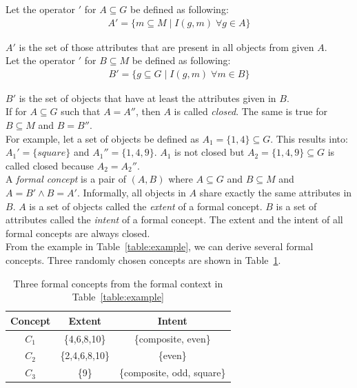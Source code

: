 \documentclass[11pt]{report}
\begin{document}
Let the operator $'$ for $A \subseteq G$ be defined as following:
\begin{align*}
	A' = \{ m \subseteq M\; |\;  I(g, m)\;   \forall g \in A\}
\end{align*}

$A'$ is the set of those attributes that are present in all objects from given $A$. \\

Let the operator $'$ for $B \subseteq M$ be defined as following:
\begin{align*}
	B' = \{ g \subseteq G\; |\;  I(g, m)\;   \forall m \in B\}
\end{align*}

$B'$ is the set of objects that have at least the attributes given in $B$. \\

If for $A \subseteq G$ such that $A = A''$, then $A$ is called \textit{closed}. The same is true for $B \subseteq M$ and $B = B''$. \\

For example, let a set of objects be defined as $A_1 = \{1,4\} \subseteq G$. This results into: $A_1' = \{square\}$ and $A_1'' = \{1,4,9\}$. $A_1$ is not closed but $A_2 = \{1,4,9\} \subseteq G$ is called closed because $A_2 = A_2''$. \\   

A \textit{formal concept} is a pair of $(A, B)$ where $A \subseteq G$ and $B \subseteq M$ and $A = B' \wedge B = A' $. Informally, all objects in $A$ share exactly the same attributes in $B$. $A$ is a set of objects called the \textit{extent} of a formal concept. $B$ is a set of attributes called the \textit{intent} of a formal concept. The extent and the intent of all formal concepts are always closed.\\

From the example in Table~\ref{table:example}, we can derive several formal concepts. Three randomly chosen concepts are shown in Table~\ref{table:exampleConcepts}. \\

\begin{table}[h]
\caption{Three formal concepts from the formal context in Table~\ref{table:example}}
\label{table:exampleConcepts}
\centering

\def\arraystretch{1.2}%
\begin{tabular}{ c c c }
\hline
 Concept & Extent & Intent \\
\hline

$C_1$ & \{4,6,8,10\} & \{composite, even\} \\
$C_2$ & \{2,4,6,8,10\} & \{even\} \\
$C_3$ & \{9\} & \{composite, odd, square\} \\

\hline
\end{tabular}
\end{table}
\end{document}
